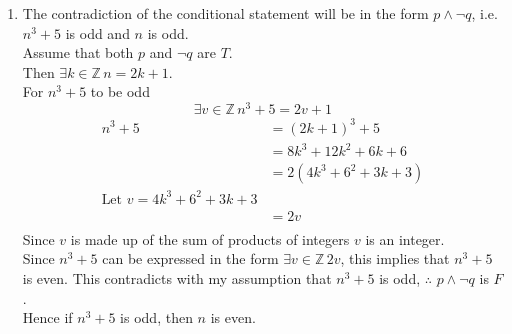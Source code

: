 \documentclass[12pt letter]{report}
\begin{document}
\begin{myproof}
\begin{enumerate}
    \item
          The contradiction of the conditional statement will be in the form $p \wedge  \neg q$, i.e. $n^3 + 5$ is odd
          and $n$ is odd.\\
          Assume that both $p$ and $\neg q$ are $T$.\\
          Then $\exists k \in \mathbb{Z} \, n = 2k + 1$. \\
          For $n^3 + 5$ to be odd
          \[
            \exists v \in \mathbb{Z}\, n^3 + 5 = 2v + 1
          \]
          \begin{align*}
            n^3 + 5 & = \left( 2k + 1 \right)^3 + 5          \\
                    & = 8k^3 + 12k^2 + 6k + 6                \\
                    & = 2 \left( 4k^3 + 6^2 + 3k + 3 \right) \\
            \text{Let } v =  4k^3 + 6^2 + 3k + 3             \\
                    & = 2v                                   \\
          \end{align*}
          Since $v$ is made up of the sum of products of integers $v$ is an integer.\\
          Since $n^3 + 5$ can be expressed in the form $\exists v \in \mathbb{Z} \, 2v$, this implies that $n^3 + 5$
          is even. This contradicts with my assumption that $n^3 + 5$ is odd, $\therefore$ $p \wedge \neg q$ is
          $F$.\\
          Hence if $n^3 + 5$ is odd, then $n$ is even.
  \end{enumerate}
\end{myproof}

\end{document}
